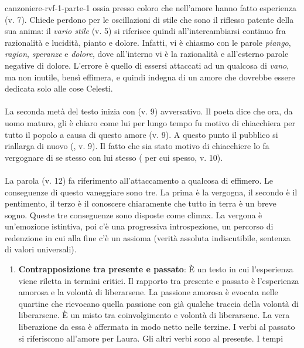 \documentclass[preview]{standalone}
\begin{document}
\begin{snippet}{canzoniere-rvf-1-parte-1}
    ossia presso coloro che nell'amore hanno fatto esperienza (v. 7).
    Chiede perdono per le oscillazioni di stile che sono il riflesso patente della sua anima:
    il \textit{vario stile} (v. 5) si riferisce quindi all'intercambiarsi continuo fra
    razionalità e lucidità, pianto e dolore. Infatti, vi è chiasmo con le parole \textit{piango},
    \textit{ragion}, \textit{speranze} e \textit{dolore}, dove all'interno vi è la razionalità e all'esterno
    parole negative di dolore.
    L'errore è quello di essersi attaccati ad un qualcosa di \textit{vano}, ma non inutile, bensì effimera, e quindi
    indegna di un amore che dovrebbe essere dedicata solo alle cose Celesti.
    \\\\
    La seconda metà del testo inizia con  (v. 9) avversativo.
    Il poeta dice che ora, da uomo maturo, gli è chiaro come lui per lungo tempo fu motivo
    di chiacchiera per tutto il popolo a causa di questo amore (v. 9).
    A questo punto il pubblico si riallarga di nuovo (, v. 9).
    Il fatto che sia stato motivo di chiacchiere lo fa vergognare di se stesso con lui stesso
    ( \textrightarrow per cui spesso, v. 10).
    \\\\
    La parola  (v. 12) fa riferimento all'attaccamento a qualcosa di effimero.
    Le conseguenze di questo vaneggiare sono tre.
    La prima è la vergogna, il secondo è il pentimento, il terzo è il conoscere chiaramente che tutto in
    terra è un breve sogno. Queste tre conseguenze sono disposte come climax. La vergona è un'emozione istintiva, poi 
    c'è una progressiva introspezione, un percorso di redenzione in cui alla fine c'è un assioma (verità assoluta indiscutibile,
    sentenza di valori universali).
    \begin{enumerate}
        \item \textbf{Contrapposizione tra presente e passato}:
            È un testo in cui l'esperienza viene riletta in termini critici. Il rapporto tra presente e passato è
            l'esperienza amorosa e la volontà di liberarsene. La passione amorosa è evocata nelle quartine che
            rievocano quella passione con già qualche traccia della volontà di liberarsene. È un misto tra
            coinvolgimento e volontà di liberarsene. La vera liberazione da essa è affermata in modo netto nelle
            terzine. I verbi al passato si riferiscono all'amore per Laura. Gli altri verbi sono al presente. I tempi

\end{enumerate}
\end{snippet}
\end{document}
